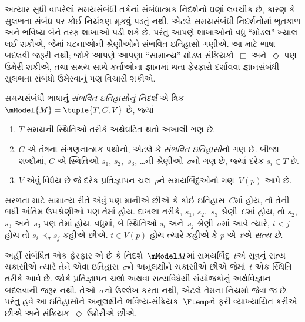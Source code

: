 \begingroup
\makeatletter{}\makeatother


\label{guunit:OLP-0481}


અત્યાર સુધી વાપરેલાં સમયસંબંધી તર્કનાં સંબંધાત્મક નિદર્શનો ઘણાં
લવચીક છે, કારણ કે સુલભતા સંબંધ પર કોઈ નિયંત્રણ મૂકવું પડતું નથી.
એટલે સમયસંબંધી નિદર્શનોમાં ભૂતકાળ અને ભવિષ્ય બંને તરફ શાખાઓ પડી
શકે છે. પરંતુ આપણે શાખાઓનો વધુ ``મોડલ'' ખ્યાલ લઈ શકીએ, જેમાં
ઘટનાઓની શ્રેણીઓને સંભવિત ઇતિહાસો ગણીએ. આ માટે ભાષા બદલવી જરૂરી
નથી; જોકે આપણે આપણા ``સામાન્ય'' મોડલ સંક્રિયકો~$\Box$ અને~$\Diamond$
પણ ઉમેરી શકીએ, તથા સમય સાથે કર્તાઓના જ્ઞાનમાં થતા ફેરફારો દર્શાવવા
જ્ઞાનસંબંધી સુલભતા સંબંધો ઉમેરવાનું પણ વિચારી શકીએ.

\begin{defn}
  સમયસંબંધી ભાષાનું \emph{સંભવિત ઇતિહાસોનું નિદર્શ} એ ત્રિક
  $\mModel{M} = \tuple{T, C, V}$ છે, જ્યાં
  \begin{enumerate}
    \item $T$ સમયની સ્થિતિઓ તરીકે અર્થઘટિત થતો અખાલી ગણ છે.
    \item $C$ એ તંત્રના સંગણનાત્મક પથોનો, એટલે કે \emph{સંભવિત
      ઇતિહાસો}નો ગણ છે. બીજા શબ્દોમાં, $C$ એ સ્થિતિઓ
      $s_1$, $s_2$,~$s_3$, \dots ની શ્રેણીઓ~$\sigma$નો ગણ છે,
      જ્યાં દરેક $s_i \in T$ છે.
    \item $V$ એવું વિધેય છે જે દરેક પ્રતિજ્ઞાપન ચલ~$p$ને સમયબિંદુઓનો ગણ~$V(p)$ આપે છે.
  \end{enumerate}
  સરળતા માટે સામાન્ય રીતે એવું પણ માનીએ છીએ કે કોઈ ઇતિહાસ~$C$માં
  હોય, તો તેની બધી અંતિમ ઉપશ્રેણીઓ પણ તેમાં હોય. દાખલા તરીકે,
  $s_1$, $s_2$,~$s_3$ શ્રેણી~$C$માં હોય, તો $s_2$, $s_3$ અને~$s_3$
  પણ તેમાં હોય. વધુમાં, બે સ્થિતિઓ $s_i$ અને~$s_j$ શ્રેણી~$\sigma$માં
  આવે ત્યારે, $i < j$ હોય તો $s_i \prec_\sigma s_j$ કહીએ છીએ.
  $t \in V(p)$ હોય ત્યારે કહીએ કે $p$ એ~$t$એ \emph{સત્ય છે}.
\end{defn}

અહીં સંબંધિત એક ફેરફાર એ છે કે નિદર્શ~$\mModel M$માં
સમયબિંદુ~$t$એ સૂત્રનું સત્ય ચકાસીએ ત્યારે તેને એવા
ઇતિહાસ~$\sigma$ને અનુલક્ષીને ચકાસીએ છીએ જેમાં~$t$ એક સ્થિતિ તરીકે
આવે છે. જોકે પ્રતિજ્ઞાપન ચલો અથવા સત્યવિધેયી
સંયોજકોનું અર્થવિજ્ઞાન બદલવાની જરૂર નથી. તેઓ~$\sigma$નો ઉલ્લેખ
કરતા નથી, એટલે તેમના નિયમો  જેવા જ છે.
પરંતુ હવે આ ઇતિહાસોને અનુલક્ષીને ભવિષ્ય-સંક્રિયક~$\Ftemp$ને ફરી
વ્યાખ્યાયિત કરીએ છીએ અને સંક્રિયક~$\Diamond$ ઉમેરીએ છીએ.

